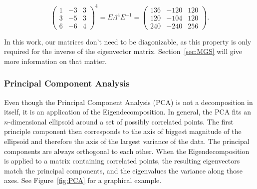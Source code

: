 \begin{equation}
  \begin{pmatrix}
    1 & {-3} & 3\\
    3 & {-5} & 3\\
    6 & {-6} & 4
  \end{pmatrix}
  ^4
  =
  E
  \Lambda^4
  E^{-1}
  =
  \begin{pmatrix}
    136 & {-120} & 120\\
    120 & {-104} & 120\\
    240 & {-240} & 256
  \end{pmatrix}
  .
\end{equation}

\noindent In this work, our matrices don't need to be diagonizable, as
this property is only required for the inverse of the eigenvector
matrix. Section~\ref{sec:MGS} will give more information on that matter.


\subsubsection{Principal Component Analysis}

Even though the Principal Component Analysis (PCA) is not a decomposition
in itself, it is an application of the Eigendecomposition. In general,
the PCA fits an $n$-dimensional ellipsoid around a set of possibly
correlated points. The first principle component then corresponds to the
axis of biggest magnitude of the ellipsoid and therefore the axis of the
largest variance of the data. The principal components are always
orthogonal to each other. When the Eigendecomposition is applied to
a matrix containing correlated points, the resulting eigenvectors match
the principal components, and the eigenvalues the variance along those
axes. See Figure~\ref{fig:PCA} for a graphical example.

